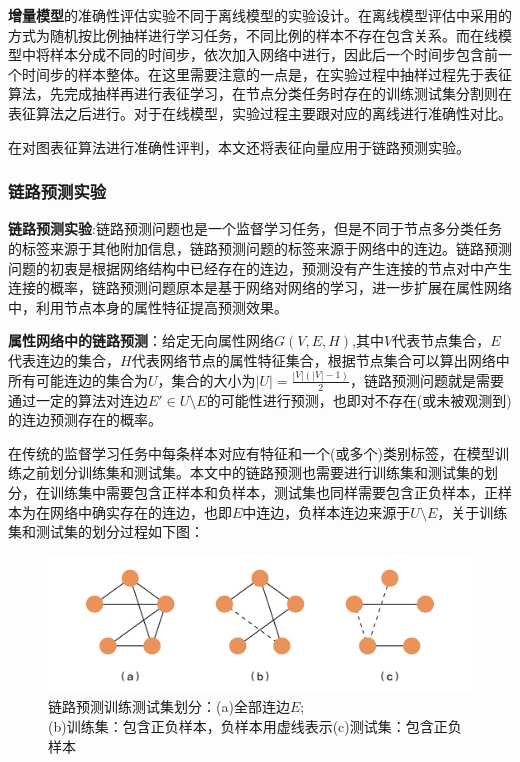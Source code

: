 \textbf{增量模型}的准确性评估实验不同于离线模型的实验设计。在离线模型评估中采用的方式为随机按比例抽样进行学习任务，不同比例的样本不存在包含关系。而在线模型中将样本分成不同的时间步，依次加入网络中进行，因此后一个时间步包含前一个时间步的样本整体。在这里需要注意的一点是，在实验过程中抽样过程先于表征算法，先完成抽样再进行表征学习，在节点分类任务时存在的训练测试集分割则在表征算法之后进行。对于在线模型，实验过程主要跟对应的离线进行准确性对比。

在对图表征算法进行准确性评判，本文还将表征向量应用于链路预测实验。
\subsubsection{链路预测实验}
\textbf{链路预测实验}:链路预测问题也是一个监督学习任务，但是不同于节点多分类任务的标签来源于其他附加信息，链路预测问题的标签来源于网络中的连边。链路预测问题的初衷是根据网络结构中已经存在的连边，预测没有产生连接的节点对中产生连接的概率，链路预测问题原本是基于网络对网络的学习，进一步扩展在属性网络中，利用节点本身的属性特征提高预测效果。

\textbf{属性网络中的链路预测}：给定无向属性网络$G(V,E,H)$,其中$V$代表节点集合，$E$代表连边的集合，$H$代表网络节点的属性特征集合，根据节点集合可以算出网络中所有可能连边的集合为$U$，集合的大小为$|U| = \frac{|V|(|V|-1)}{2}$，链路预测问题就是需要通过一定的算法对连边$E\prime\in U\setminus E$的可能性进行预测，也即对不存在(或未被观测到)的连边预测存在的概率。

在传统的监督学习任务中每条样本对应有特征和一个(或多个)类别标签，在模型训练之前划分训练集和测试集。本文中的链路预测也需要进行训练集和测试集的划分，在训练集中需要包含正样本和负样本，测试集也同样需要包含正负样本，正样本为在网络中确实存在的连边，也即$E$中连边，负样本连边来源于$U\setminus E$，关于训练集和测试集的划分过程如下图：
\begin{figure}
	\centering
	\includegraphics[width=5in]{figures/link_prediction_split}
	\caption{链路预测训练测试集划分：(a)全部连边$E$;\\(b)训练集：包含正负样本，负样本用虚线表示(c)测试集：包含正负样本}
\end{figure}

